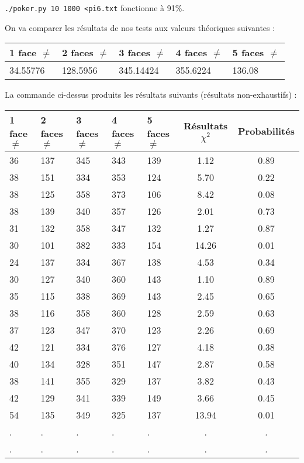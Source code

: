 \documentclass[12pt,a4paper]{article}
\begin{document}
\texttt{./poker.py 10 1000 <pi6.txt} fonctionne à 91\%.

On va comparer les résultats de nos tests aux valeurs théoriques suivantes :
\begin{center}
\begin{tabular}{|l|l|l|l|l|}
\hline
1 face $\neq$ & 2 faces $\neq$  & 3 faces $\neq$ & 4 faces $\neq$ & 5 faces $\neq$\\
\hline \hline
34.55776 & 128.5956 & 345.14424 & 355.6224 & 136.08\\ \hline
\end{tabular}
\end{center}
La commande ci-dessus produits les résultats suivants (résultats non-exhaustifs) : 
\begin{center}
\begin{tabular}{|l|l|l|l|l|c|c|}
\hline
1 face $\neq$ & 2 faces $\neq$  & 3 faces $\neq$ & 4 faces $\neq$ & 5 faces $\neq$ & Résultats $\chi^2$ & Probabilités \\
\hline \hline
36 & 137 & 345 & 343 & 139 &  1.12 &  0.89\\ \hline
38 & 151 & 334 & 353 & 124 &  5.70 &  0.22\\ \hline
38 & 125 & 358 & 373 & 106 &  8.42 &  0.08\\ \hline
38 & 139 & 340 & 357 & 126 &  2.01 &  0.73\\ \hline
31 & 132 & 358 & 347 & 132 &  1.27 &  0.87\\ \hline
30 & 101 & 382 & 333 & 154 & 14.26 &  0.01\\ \hline
24 & 137 & 334 & 367 & 138 &  4.53 &  0.34\\ \hline
30 & 127 & 340 & 360 & 143 &  1.10 &  0.89\\ \hline
35 & 115 & 338 & 369 & 143 &  2.45 &  0.65\\ \hline
38 & 116 & 358 & 360 & 128 &  2.59 &  0.63\\ \hline
37 & 123 & 347 & 370 & 123 &  2.26 &  0.69\\ \hline
42 & 121 & 334 & 376 & 127 &  4.18 &  0.38\\ \hline
40 & 134 & 328 & 351 & 147 &  2.87 &  0.58\\ \hline
38 & 141 & 355 & 329 & 137 &  3.82 &  0.43\\ \hline
42 & 129 & 341 & 339 & 149 &  3.66 &  0.45\\ \hline
54 & 135 & 349 & 325 & 137 & 13.94 &  0.01\\ \hline
 . & . & . & . & . & . & . \\ \hline
 . & . & . & . & . & . & . \\ \hline

\end{tabular}
\end{center}
\end{document}
